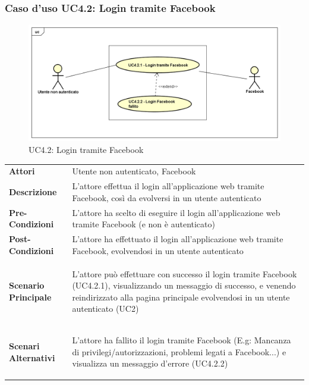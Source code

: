 \newpage
\subsubsection{Caso d'uso UC4.2: Login tramite Facebook }
\label{UC4_2}
\begin{figure}[!htbp]
	\centering
	\includegraphics[scale=0.45]{UML/UC4_2.png}
	\caption{UC4.2: Login tramite Facebook}
\end{figure}

\begin{tabular}{ l | p{11cm}}
	\hline
	\rowcolor{Gray}
	 \multicolumn{2}{c}{UC4.2 - Login tramite Facebook} \\
	 \hline
	\textbf{Attori} & Utente non autenticato, Facebook \\
	\textbf{Descrizione} & L'attore effettua il login all'applicazione web tramite Facebook, così da evolversi in un utente autenticato \\
	\textbf{Pre-Condizioni} & L'attore ha scelto di eseguire il login all'applicazione web tramite Facebook (e non è autenticato) \\
	\textbf{Post-Condizioni} & L'attore ha effettuato il login all'applicazione web tramite Facebook, evolvendosi in un utente autenticato \\
	\textbf{Scenario Principale} & 
	\begin{enumerate*}[label=(\arabic*.),itemjoin={\newline}]
		\item L'attore può effettuare con successo il login tramite Facebook (UC4.2.1), visualizzando un messaggio di successo, e venendo reindirizzato alla pagina principale evolvendosi in un utente autenticato (UC2)
	\end{enumerate*}\\
	\textbf{Scenari Alternativi} & 
	\begin{enumerate*}[label=(\arabic*.),itemjoin={\newline}]
	\item L'attore ha fallito il login tramite Facebook (E.g: Mancanza di privilegi/autorizzazioni, problemi legati a Facebook...) e visualizza un messaggio d'errore (UC4.2.2)
	\end{enumerate*}\\
\end{tabular}